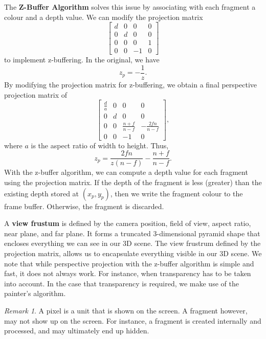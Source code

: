 \documentclass[11pt]{article}
\theoremstyle{plain} %
\theoremstyle{definition}
\theoremstyle{example}
\theoremstyle{remark}
\newtheorem*{remark}{Remark}
\begin{document}
The \textbf{Z-Buffer Algorithm} solves this issue by associating with each fragment a colour and a depth value. We can modify the projection matrix
$$\begin{bmatrix}d & 0 & 0 & 0 \\ 0 & d & 0 & 0 \\ 0 & 0 & 0 & 1 \\0 & 0 & -1 & 0\end{bmatrix}$$ to implement z-buffering. In the original, we have $$z_p = -\frac{1}{z}.$$
By modifying the projection matrix for z-buffering, we obtain a final perspective projection matrix of 
$$\begin{bmatrix}\frac{d}{a} & 0 & 0 & 0 \\ 0 & d & 0 & 0 \\ 0 & 0&\frac{n+f}{n-f} & -\frac{2fn}{n-f} \\ 0 & 0 & - 1 & 0\end{bmatrix},$$
where $a$ is the aspect ratio of width to height. Thus, 
$$z_p =  \frac{2fn}{z(n-f)} - \frac{n+f}{n-f}.$$
With the z-buffer algorithm, we can compute a depth value for each fragment using the projection matrix. If the depth of the fragment is less (greater) than the existing depth stored at $(x_p, y_p)$, then we write the fragment colour to the frame buffer. Otherwise, the fragment is discarded. 

A \textbf{view frustum} is defined by the camera position, field of view, aspect ratio, near plane, and far plane. It forms a truncated 3-dimensional pyramid shape that encloses everything we can see in our 3D scene. The view frustrum defined by the projection matrix, allows us to encapsulate everything visible in our 3D scene. We note that while perspective projection with the z-buffer algorithm is simple and fast, it does not always work. For instance, when transparency has to be taken into account. In the case that transparency is required, we make use of the painter's algorithm. 

\begin{remark}
A pixel is a unit that is shown on the screen. A fragment however, may not show up on the screen. For instance, a fragment is created internally and processed, and may ultimately end up hidden. 
\end{remark}
\end{document}
